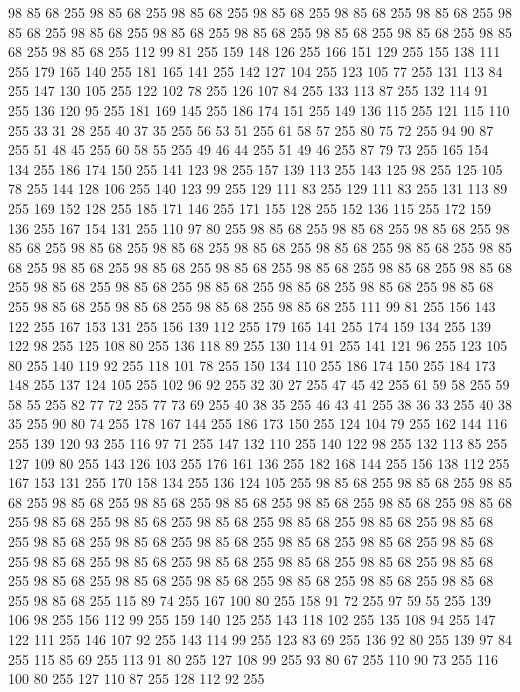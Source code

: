 98 85 68 255 98 85 68 255 98 85 68 255 98 85 68 255 98 85 68 255 98 85 68 255 98 85 68 255 98 85 68 255 98 85 68 255 98 85 68 255 98 85 68 255 98 85 68 255 98 85 68 255 98 85 68 255 112 99 81 255 159 148 126 255 166 151 129 255 155 138 111 255 179 165 140 255 181 165 141 255 142 127 104 255 123 105 77 255 131 113 84 255 147 130 105 255 122 102 78 255 126 107 84 255 133 113 87 255 132 114 91 255 136 120 95 255 181 169 145 255 186 174 151 255 149 136 115 255 121 115 110 255 33 31 28 255 40 37 35 255 56 53 51 255 61 58 57 255 80 75 72 255 94 90 87 255 51 48 45 255 60 58 55 255 49 46 44 255 51 49 46 255 87 79 73 255 165 154 134 255 186 174 150 255 141 123 98 255 157 139 113 255 143 125 98 255 125 105 78 255 144 128 106 255 140 123 99 255 129 111 83 255 129 111 83 255 131 113 89 255 169 152 128 255 185 171 146 255 171 155 128 255 152 136 115 255 172 159 136 255 167 154 131 255 110 97 80 255 98 85 68 255 98 85 68 255
98 85 68 255 98 85 68 255 98 85 68 255 98 85 68 255 98 85 68 255 98 85 68 255 98 85 68 255 98 85 68 255 98 85 68 255 98 85 68 255 98 85 68 255 98 85 68 255 98 85 68 255 98 85 68 255 98 85 68 255 98 85 68 255 98 85 68 255 98 85 68 255 98 85 68 255 98 85 68 255 98 85 68 255 98 85 68 255 98 85 68 255 98 85 68 255 111 99 81 255 156 143 122 255 167 153 131 255 156 139 112 255 179 165 141 255 174 159 134 255 139 122 98 255 125 108 80 255 136 118 89 255 130 114 91 255 141 121 96 255 123 105 80 255 140 119 92 255 118 101 78 255 150 134 110 255 186 174 150 255 184 173 148 255 137 124 105 255 102 96 92 255 32 30 27 255 47 45 42 255 61 59 58 255 59 58 55 255 82 77 72 255 77 73 69 255 40 38 35 255 46 43 41 255 38 36 33 255 40 38 35 255 90 80 74 255 178 167 144 255 186 173 150 255 124 104 79 255 162 144 116 255 139 120 93 255 116 97 71 255 147 132 110 255 140 122 98 255 132 113 85 255 127 109 80 255
143 126 103 255 176 161 136 255 182 168 144 255 156 138 112 255 167 153 131 255 170 158 134 255 136 124 105 255 98 85 68 255 98 85 68 255 98 85 68 255 98 85 68 255 98 85 68 255 98 85 68 255 98 85 68 255 98 85 68 255 98 85 68 255 98 85 68 255 98 85 68 255 98 85 68 255 98 85 68 255 98 85 68 255 98 85 68 255 98 85 68 255 98 85 68 255 98 85 68 255 98 85 68 255 98 85 68 255 98 85 68 255 98 85 68 255 98 85 68 255 98 85 68 255 98 85 68 255 98 85 68 255 98 85 68 255 98 85 68 255 98 85 68 255 98 85 68 255 98 85 68 255 98 85 68 255 98 85 68 255 98 85 68 255 115 89 74 255 167 100 80 255 158 91 72 255 97 59 55 255 139 106 98 255 156 112 99 255 159 140 125 255 143 118 102 255 135 108 94 255 147 122 111 255 146 107 92 255 143 114 99 255 123 83 69 255 136 92 80 255 139 97 84 255 115 85 69 255 113 91 80 255 127 108 99 255 93 80 67 255 110 90 73 255 116 100 80 255 127 110 87 255 128 112 92 255

